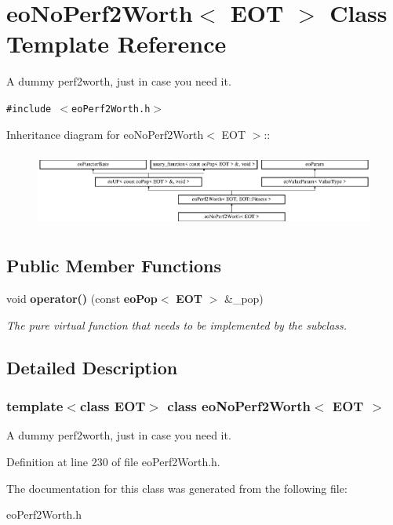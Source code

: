 \section{eo\-No\-Perf2Worth$<$ EOT $>$ Class Template Reference}
\label{classeo_no_perf2_worth}
A dummy perf2worth, just in case you need it.  


{\tt \#include $<$eo\-Perf2Worth.h$>$}

Inheritance diagram for eo\-No\-Perf2Worth$<$ EOT $>$::\begin{figure}[H]
\begin{center}
\leavevmode
\includegraphics[height=2.52252cm]{classeo_no_perf2_worth}
\end{center}
\end{figure}
\subsection*{Public Member Functions}
\begin{CompactItemize}
\item 
void {\bf operator()} (const {\bf eo\-Pop}$<$ {\bf EOT} $>$ \&\_\-pop)\label{classeo_no_perf2_worth_a0}

\begin{CompactList}\small\item\em The pure virtual function that needs to be implemented by the subclass. \item\end{CompactList}\end{CompactItemize}


\subsection{Detailed Description}
\subsubsection*{template$<$class EOT$>$ class eo\-No\-Perf2Worth$<$ EOT $>$}

A dummy perf2worth, just in case you need it. 



Definition at line 230 of file eo\-Perf2Worth.h.

The documentation for this class was generated from the following file:\begin{CompactItemize}
\item 
eo\-Perf2Worth.h\end{CompactItemize}
